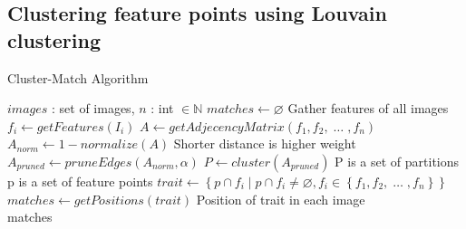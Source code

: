\documentclass{article}
\begin{document}
\subsection{Clustering feature points using Louvain clustering}

\begin{algorithm}
\caption{Cluster-Match Algorithm}
\label{alg-simple}
\begin{algorithmic}
\Require $images$ : set of images, $n$ : int $\in \mathbb{N}$
\State $matches\gets \varnothing$
 \Comment Gather features of all images
	\State $f_i\gets getFeatures(I_i)$
\EndFor
\State $A\gets getAdjecencyMatrix(f_1, f_2,\; \ldots \;, f_n)$
\State $A_{norm}\gets 1 - normalize(A)$
\Comment Shorter distance is higher weight
\State $A_{pruned}\gets pruneEdges(A_{norm},\alpha)$
\State $P\gets cluster(A_{pruned})$ 
\Comment P is a set of partitions
 \Comment p is a set of feature points
	\State $trait\gets \left\{p \cap f_i \mid p \cap f_i \neq 
\varnothing, f_i \in \left\{f_1, f_2,\; \ldots \;, f_n\right\}\right\}$
		\State $matches\gets getPositions(trait)$
		\Comment Position of trait in each image
	\EndIf
\EndFor \\
\Return matches
\end{algorithmic}
\end{algorithm}
\end{document}
